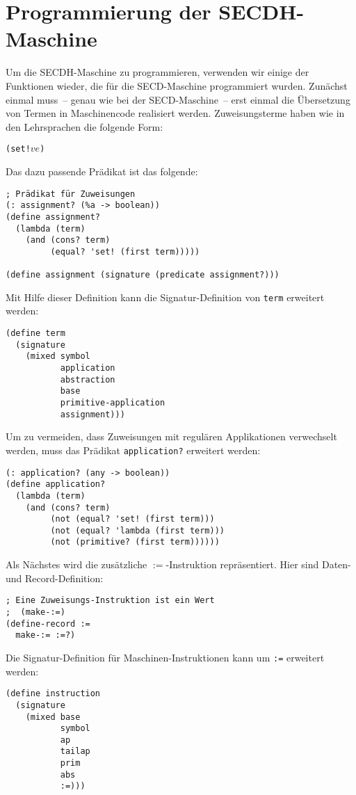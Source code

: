 \section{Programmierung der SECDH-Maschine}


Um die SECDH-Maschine zu programmieren, verwenden wir einige der
Funktionen wieder, die für die SECD-Maschine programmiert
wurden.  Zunächst einmal muss~-- genau wie bei der SECD-Maschine~--
erst einmal die Übersetzung von Termen in Maschinencode realisiert
werden.  Zuweisungsterme haben wie in den Lehrsprachen die folgende Form:
%
\begin{alltt}
(set! \(v\) \(e\))
\end{alltt}
%
Das dazu passende Prädikat ist das folgende:
%
\begin{lstlisting}
; Prädikat für Zuweisungen
(: assignment? (%a -> boolean))
(define assignment?
  (lambda (term)
    (and (cons? term)
         (equal? 'set! (first term)))))

(define assignment (signature (predicate assignment?)))
\end{lstlisting}
%
Mit Hilfe dieser Definition kann die Signatur-Definition von
\lstinline{term} erweitert werden:
%
\begin{lstlisting}
(define term
  (signature
    (mixed symbol
           application
           abstraction
           base
           primitive-application
           assignment)))
\end{lstlisting}
%
Um zu vermeiden, dass Zuweisungen mit regulären Applikationen
verwechselt werden, muss das Prädikat \lstinline{application?} erweitert
werden:
%
\begin{lstlisting}
(: application? (any -> boolean))
(define application?
  (lambda (term)
    (and (cons? term)
         (not (equal? 'set! (first term)))
         (not (equal? 'lambda (first term)))
         (not (primitive? (first term))))))
\end{lstlisting}
%
Als Nächstes wird die zusätzliche $\mathtt{:=}$-Instruktion
repräsentiert.  Hier sind Daten- und Record-Definition:
%
\begin{lstlisting}
; Eine Zuweisungs-Instruktion ist ein Wert
;  (make-:=)
(define-record :=
  make-:= :=?)
\end{lstlisting}
%
Die Signatur-Definition für Maschinen-Instruktionen kann um \lstinline{:=}
erweitert werden:
%
\begin{lstlisting}
(define instruction
  (signature
    (mixed base
           symbol
           ap
           tailap
           prim
           abs
           :=)))
\end{lstlisting}

